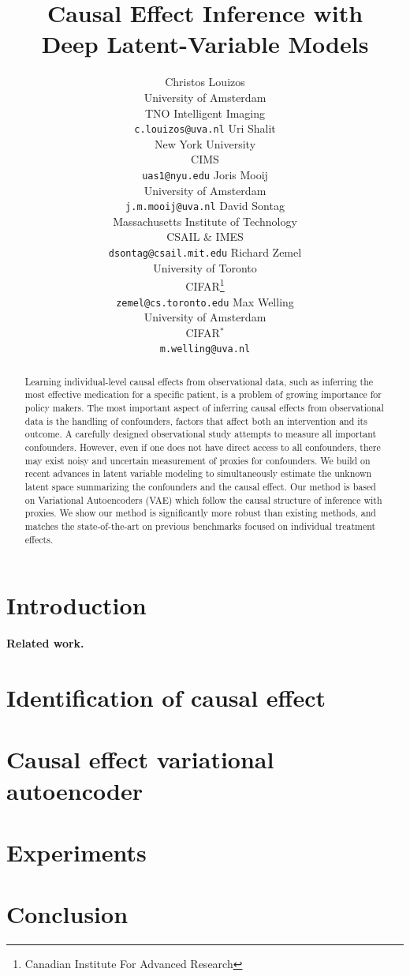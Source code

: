 \documentclass{article}
\title{Causal Effect Inference with \\ Deep Latent-Variable Models}
\author{ Christos Louizos \\
University of Amsterdam\\
TNO Intelligent Imaging\\
\texttt{c.louizos@uva.nl}
\And
Uri Shalit  \\
New York University\\
CIMS\\
\texttt{uas1@nyu.edu}
\And
Joris Mooij   \\
University of Amsterdam\\
\texttt{j.m.mooij@uva.nl}
\AND 
David Sontag\\
Massachusetts Institute of Technology\\
CSAIL \& IMES\\
\texttt{dsontag@csail.mit.edu}
\And 
Richard Zemel\\
University of Toronto\\
CIFAR\thanks{Canadian Institute For Advanced Research}\\
\texttt{zemel@cs.toronto.edu}
\And 
Max Welling\\
University of Amsterdam\\
CIFAR$^*$\\
\texttt{m.welling@uva.nl}
}
\begin{document}
\maketitle

\begin{abstract}
Learning individual-level causal effects from observational data, such as inferring the most effective medication for a specific patient, is a problem of growing importance for policy makers. The most important aspect of inferring causal effects from observational data is the handling of confounders, factors that affect both an intervention and its outcome. A carefully designed observational study attempts to measure all important confounders. However, even if one does not have direct access to all confounders, there may exist noisy and uncertain measurement of proxies for confounders.
We build on recent advances in latent variable modeling to simultaneously estimate the unknown latent space summarizing the confounders and the causal effect. 
Our method is based on Variational Autoencoders (VAE) which follow the causal structure of inference with proxies. We show our method is significantly more robust than existing methods, and matches the state-of-the-art on previous benchmarks focused on individual treatment effects. 
\end{abstract}

\section{Introduction}


{\bf Related work.} \;


\section{Identification of causal effect}\label{sec:ident}


\section{Causal effect variational autoencoder}


\section{Experiments}


\section{Conclusion}

\end{document}
